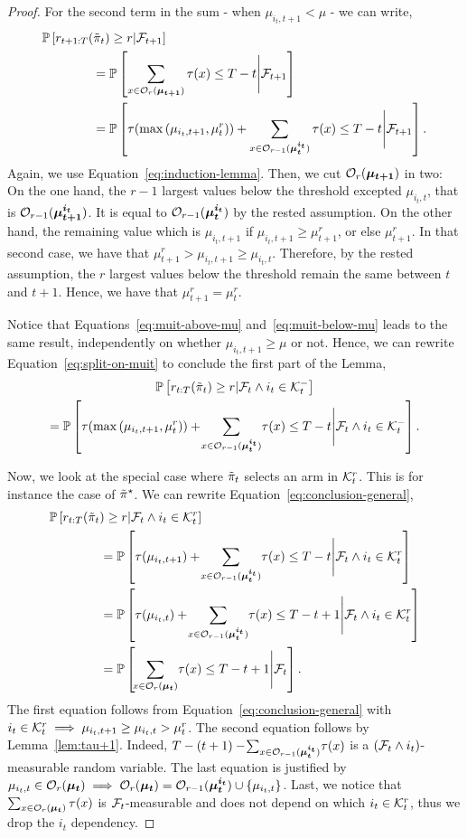 \begin{proof}
For the second term in the sum - when $\mu_{i_t, t+1} < \mu$ - we can write, 
\begin{align}
&\mathbb{P}\left[r_{t+1:T}(\Tilde{\pi}_t) \geq r| \mathcal{F}_{t+1}\right]\nonumber \\
&\qquad \qquad = \mathbb{P}\left[\sum_{x \in \mathcal{O}_r(\boldsymbol{\mu}_{\boldsymbol{t+1}})} \tau(x) \leq T - t \Bigg| \mathcal{F}_{t+1}\right] \nonumber \\
&\qquad \qquad= \mathbb{P}\left[\tau(\max\left(\mu_{i_t,t+1}, \mu^{r}_{t}\right))+\sum_{x \in \mathcal{O}_{r-1}(\boldsymbol{\mu_t}^{\boldsymbol{i_t}})} \tau(x) \leq T - t \Bigg| \mathcal{F}_{t+1}\right].
\label{eq:muit-below-mu}
\end{align}
Again, we use Equation~\ref{eq:induction-lemma}. Then, we cut $\mathcal{O}_r(\boldsymbol{\mu}_{\boldsymbol{t+1}})$ in two: On the one hand, the $r-1$ largest values below the threshold excepted $\mu_{i_t,t}$, that is $\mathcal{O}_{r-1}(\boldsymbol{\mu}_{\boldsymbol{t+1}}^{\boldsymbol{i_t}})$. It is equal to $\mathcal{O}_{r-1}(\boldsymbol{\mu_t}^{\boldsymbol{i_t}})$ by the rested assumption. On the other hand, the remaining value which is $\mu_{i_t,t+1}$ if $\mu_{i_t,t+1} \geq \mu^{r}_{t+1}$, or else $\mu^{r}_{t+1}$. In that second case, we have that $\mu^{r}_{t+1} > \mu_{i_t,t+1} \geq \mu_{i_t,t}$. Therefore, by the rested assumption, the $r$ largest values below the threshold remain the same between $t$ and $t+1$. Hence, we have that $\mu^{r}_{t+1} = \mu^r_{t}$.

Notice that Equations~\ref{eq:muit-above-mu} and~\ref{eq:muit-below-mu} leads to the same result, independently on whether $\mu_{i_t,t+1} \geq \mu$ or not. Hence, we can rewrite Equation~\ref{eq:split-on-muit} to conclude the first part of the Lemma,
 \begin{multline}
 \mathbb{P}\left[r_{t:T}(\Tilde{\pi}_t) \geq r| \mathcal{F}_t\land i_t \in \mathcal{K}_t^-\right] \\= \mathbb{P}\left[\tau(\max\left(\mu_{i_t,t+1}, \mu^{r}_{t}\right))+\!\sum_{x \in \mathcal{O}_{r-1}(\boldsymbol{\mu_t}^{\boldsymbol{i_t}})} \!\tau(x) \leq T - t \Bigg| \mathcal{F}_t\land i_t \in \mathcal{K}_t^-\right].
 \label{eq:conclusion-general}
 \end{multline}

Now, we look at the special case where $\Tilde{\pi}_t$ selects an arm in $\mathcal{K}_t^r$. This is for instance the case of $\Tilde{\pi}^\star$. We can rewrite Equation~\ref{eq:conclusion-general}, 
 \begin{align*}
 &\mathbb{P}\left[r_{t:T}(\Tilde{\pi}_t) \geq r| \mathcal{F}_t\land i_t \in \mathcal{K}_t^r\right] \\
 &\qquad \qquad= \mathbb{P}\left[\tau(\mu_{i_t,t+1})+\!\sum_{x \in \mathcal{O}_{r-1}(\boldsymbol{\mu_t}^{\boldsymbol{i_t}})} \!\tau(x) \leq T - t \Bigg| \mathcal{F}_t\land i_t \in \mathcal{K}_t^r\right]\\
 &\qquad \qquad= \mathbb{P}\left[\tau(\mu_{i_t,t})+\!\sum_{x \in \mathcal{O}_{r-1}(\boldsymbol{\mu_t}^{\boldsymbol{i_t}})} \!\tau(x) \leq T - t +1 \Bigg| \mathcal{F}_t\land i_t\in \mathcal{K}_t^r\right]\\
 &\qquad \qquad= \mathbb{P}\left[\!\sum_{x \in \mathcal{O}_r(\boldsymbol{\mu_t})} \!\tau(x) \leq T - t +1 \Bigg| \mathcal{F}_t\right].
 \end{align*}
 The first equation follows from Equation~\ref{eq:conclusion-general} with $i_t \in \mathcal{K}_t^r \implies \mu_{i_t,t+1} \geq \mu_{i_t,t} > \mu^r_{t}$. The second equation follows by Lemma~\ref{lem:tau+1}. Indeed, $T-(t+1)- \!\sum_{x \in \mathcal{O}_{r-1}(\boldsymbol{\mu_t}^{\boldsymbol{i_t}})} \!\tau(x)$ is a $\left(\mathcal{F}_t \land i_t\right)$-measurable random variable. The last equation is justified by $\mu_{i_t,t} \in \mathcal{O}_r(\boldsymbol{\mu_t}) \implies \mathcal{O}_r(\boldsymbol{\mu_t}) = \mathcal{O}_{r-1}(\boldsymbol{\mu_t}^{\boldsymbol{i_t}}) \cup \left\{\mu_{i_t,t}\right\}$. Last, we notice that $\sum_{x \in \mathcal{O}_r(\boldsymbol{\mu_t})} \tau(x)$ is $\mathcal{F}_t$-measurable and does not depend on which $i_t\in \mathcal{K}_t^r$, thus we drop the $i_t$ dependency.
\end{proof}



